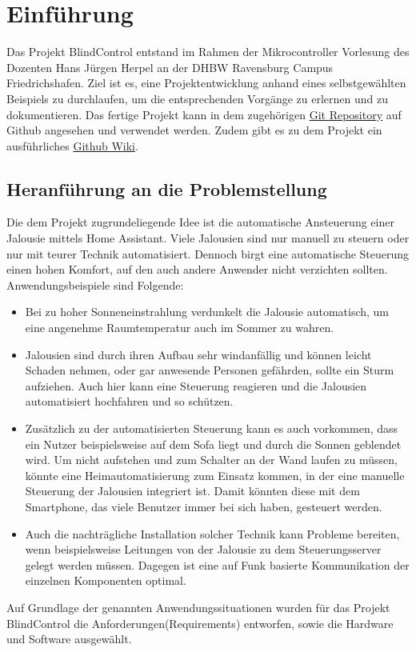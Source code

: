 \chapter{Einführung}
\label{cha:Einführung}
Das Projekt BlindControl entstand im Rahmen der Mikrocontroller Vorlesung des Dozenten Hans Jürgen Herpel an der DHBW Ravensburg Campus Friedrichshafen. Ziel ist es, eine Projektentwicklung anhand eines selbstgewählten Beispiels zu durchlaufen, um die entsprechenden Vorgänge zu erlernen und zu dokumentieren. Das fertige Projekt kann in dem zugehörigen \href{https://github.com/maxbachmann-university/BlindControl}{Git Repository} auf Github angesehen und verwendet werden. Zudem gibt es zu dem Projekt ein ausführliches \href{https://github.com/maxbachmann-university/BlindControl/wiki}{Github Wiki}.

\section{Heranführung an die Problemstellung}
Die dem Projekt zugrundeliegende Idee ist die automatische Ansteuerung einer Jalousie mittels Home Assistant. Viele Jalousien sind nur manuell zu steuern oder nur mit teurer Technik automatisiert. Dennoch birgt eine automatische Steuerung einen hohen Komfort, auf den auch andere Anwender nicht verzichten sollten. Anwendungsbeispiele sind Folgende:
\begin{itemize}
	\item Bei zu hoher Sonneneinstrahlung verdunkelt die Jalousie automatisch, um eine angenehme Raumtemperatur auch im Sommer zu wahren.
	\item Jalousien sind durch ihren Aufbau sehr windanfällig und können leicht Schaden nehmen, oder gar anwesende Personen gefährden, sollte ein Sturm aufziehen. Auch hier kann eine Steuerung reagieren und die Jalousien automatisiert hochfahren und so schützen.
	\item Zusätzlich zu der automatisierten Steuerung kann es auch vorkommen, dass ein Nutzer beispielsweise auf dem Sofa liegt und durch die Sonnen geblendet wird. Um nicht aufstehen und zum Schalter an der Wand laufen zu müssen, könnte eine Heimautomatisierung zum Einsatz kommen, in der eine manuelle Steuerung der Jalousien integriert ist. Damit könnten diese mit dem Smartphone, das viele Benutzer immer bei sich haben, gesteuert werden.
	\item Auch die nachträgliche Installation solcher Technik kann Probleme bereiten, wenn beispielsweise Leitungen von der Jalousie zu dem Steuerungsserver gelegt werden müssen. Dagegen ist eine auf Funk basierte Kommunikation der einzelnen Komponenten optimal.
\end{itemize}
Auf Grundlage der genannten Anwendungssituationen wurden für das Projekt BlindControl die Anforderungen(Requirements) entworfen, sowie die Hardware und Software ausgewählt.

